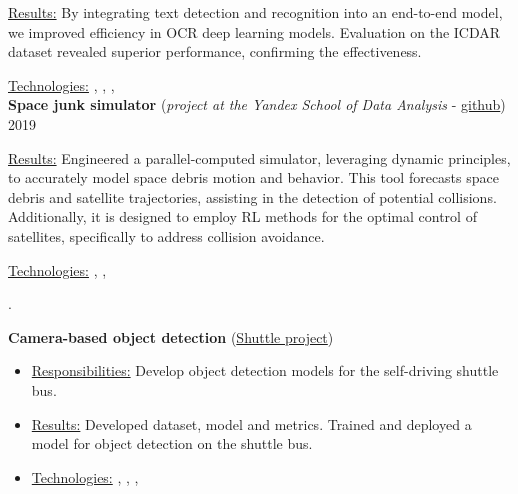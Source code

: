 \underline{Results:} By integrating text detection and recognition into an end-to-end model, we improved efficiency in OCR deep learning models. Evaluation on the ICDAR dataset revealed superior performance, confirming the effectiveness.

\underline{Technologies:} , , , 
\\
\textbf{Space junk simulator} (\textit{project at the Yandex School of Data Analysis} - \href{https://github.com/neer201/space_junk_simulator}{github})   \hfill 2019
\par
\underline{Results:} Engineered a parallel-computed simulator, leveraging dynamic principles, to accurately model space debris motion and behavior. This tool forecasts space debris and satellite trajectories, assisting in the detection of potential collisions. Additionally, it is designed to employ RL methods for the optimal control of satellites, specifically to address collision avoidance.

\underline{Technologies:} , , 
\par .\\
% 

\textbf{Camera-based object detection} (\href{https://www.engadget.com/2016/08/28/yandex-teams-on-self-driving-shuttle-bus/}{Shuttle project})
\begin{itemize}
    \item[] \underline{Responsibilities:} Develop object detection models for the self-driving shuttle bus.
    \item[] \underline{Results:} Developed dataset, model and metrics. Trained and deployed a model for object detection on the shuttle bus.
    \item[] \underline{Technologies:} , , , 
\end{itemize}

